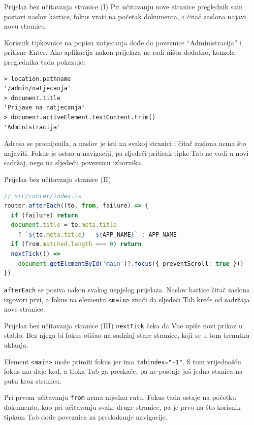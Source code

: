 \begin{frame}[fragile]{Prijelaz bez učitavanja stranice (I)}
Pri učitavanju nove stranice preglednik sam postavi naslov kartice, fokus vrati na početak dokumenta, a čitač zaslona najavi novu stranicu.

\vspace{0.4em}
Korisnik tipkovnice na popisu natjecanja dođe do poveznice \enquote{Administracija} i pritisne Enter. Ako aplikacija nakon prijelaza ne radi ništa dodatno, konzola preglednika tada pokazuje:

\begin{lstlisting}
> location.pathname
'/admin/natjecanja'
> document.title
'Prijave na natjecanja'
> document.activeElement.textContent.trim()
'Administracija'
\end{lstlisting}

\pause
\vspace{0.2em}
Adresa se promijenila, a naslov je isti na svakoj stranici i čitač zaslona nema što najaviti. Fokus je ostao u navigaciji, pa sljedeći pritisak tipke Tab ne vodi u novi sadržaj, nego na sljedeću poveznicu izbornika.
\end{frame}

\begin{frame}[fragile]{Prijelaz bez učitavanja stranice (II)}
\begin{lstlisting}[language=typescript]
// src/router/index.ts
router.afterEach((to, from, failure) => {
  if (failure) return
  document.title = to.meta.title
    ? `${to.meta.title} - ${APP_NAME}` : APP_NAME
  if (from.matched.length === 0) return
  nextTick(() =>
    document.getElementById('main')?.focus({ preventScroll: true }))
})
\end{lstlisting}

\vspace{0.3em}
\texttt{afterEach} se poziva nakon svakog uspjelog prijelaza. Naslov kartice čitač zaslona izgovori prvi, a fokus na elementu \texttt{<main>} znači da sljedeći Tab kreće od sadržaja nove stranice.
\end{frame}

\begin{frame}{Prijelaz bez učitavanja stranice (III)}
\texttt{nextTick} čeka da Vue upiše novi prikaz u stablo. Bez njega bi fokus otišao na sadržaj stare stranice, koji se u tom trenutku uklanja.

\vspace{0.9em}
Element \texttt{<main>} može primiti fokus jer ima \texttt{tabindex="-1"}. S tom vrijednošću fokus mu daje kod, a tipka Tab ga preskače, pa ne postaje još jedna stanica na putu kroz stranicu.

\vspace{0.9em}
Pri prvom učitavanju \texttt{from} nema nijednu rutu. Fokus tada ostaje na početku dokumenta, kao pri učitavanju svake druge stranice, pa je prvo na što korisnik tipkom Tab dođe poveznica za preskakanje navigacije.
\end{frame}

